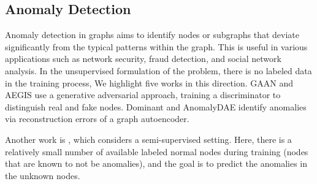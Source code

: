 \documentclass{article}
\theoremstyle{plain}
\theoremstyle{definition}
\theoremstyle{remark}
\begin{document}








\subsection{Anomaly Detection}
\label{extended_sec:anomaly_detection}
Anomaly detection in graphs aims to identify nodes or subgraphs that deviate significantly from the typical patterns within the graph. This is useful in various applications such as network security, fraud detection, and social network analysis. In the unsupervised formulation of the problem, there is no labeled data in the training process, We highlight five works in this direction. GAAN \cite{chen2020gaan} and AEGIS \cite{ding2021aegis} use a generative adversarial approach, training a discriminator to distinguish real and fake nodes. Dominant \cite{ding2019dominant} and AnomalyDAE \cite{fan2020anomalydae} identify anomalies via reconstruction errors of a graph autoencoder. 

Another work is \cite{qiao2024ggad}, which considers a semi-supervised setting. Here, there is a relatively small number of available labeled normal nodes during training (nodes that are known to not be anomalies), and the goal is to predict the anomalies in the unknown nodes.
\end{document}
